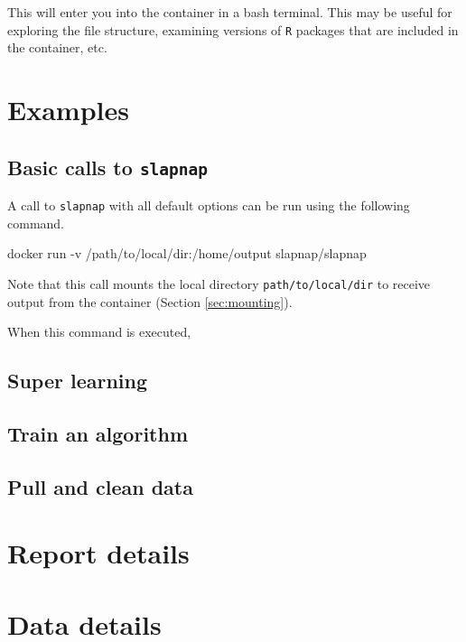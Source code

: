 \documentclass[]{article}
\newenvironment{Shaded}{\begin{snugshade}}{\end{snugshade}}
\newcommand{\ExtensionTok}[1]{#1}
\newcommand{\NormalTok}[1]{#1}
\begin{document}
This will enter you into the container in a bash terminal. This may be
useful for exploring the file structure, examining versions of
\texttt{R} packages that are included in the container, etc.

\section{Examples}\label{sec:examples}

\subsection{\texorpdfstring{Basic calls to
\texttt{slapnap}}{Basic calls to slapnap}}\label{basic-calls-to-slapnap}

A call to \texttt{slapnap} with all default options can be run using the
following command.

\begin{Shaded}
\begin{Highlighting}[]
\ExtensionTok{docker}\NormalTok{ run -v /path/to/local/dir:/home/output slapnap/slapnap}
\end{Highlighting}
\end{Shaded}

Note that this call mounts the local directory
\texttt{path/to/local/dir} to receive output from the container (Section
\ref{sec:mounting}).

When this command is executed,

\subsection{Super learning}\label{super-learning}

\subsection{Train an algorithm}\label{train-an-algorithm}

\subsection{Pull and clean data}\label{pull-and-clean-data}

\section{Report details}\label{sec:report}

\section{Data details}\label{sec:data}
\end{document}
